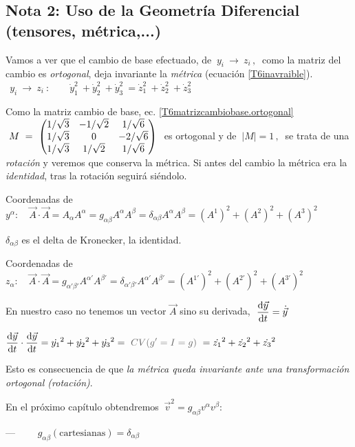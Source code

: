 \begin{ejemplo}
\subsection{Nota 2: Uso de la Geometría Diferencial (tensores, métrica,...)}
Vamos a ver que el cambio de base efectuado, de $\ y_i \ \to \ z_i\, ,\  $ como la matriz del cambio es \emph{ortogonal}, deja invariante la \emph{métrica} (ecuación \ref{T6inavraible}).
$\ \ y_i \ \to \ z_i \ : \qquad  \dot y_1^2 \ + \dot y_2^2 \ + \dot y_3^2 \ = \dot z_1^2 \ + \dot z_2^2 \ + \dot z_3^2 $

Como la matriz cambio de base, ec. \ref{T6matrizcambiobase.ortogonal}
$\ M\ = \ \mqty(1/\sqrt{3} & -1/\sqrt{2} & 1/\sqrt{6} \\ 1/\sqrt{3} & 0 & -2/\sqrt{6} \\ 1/\sqrt{3} & 1/\sqrt{2} & 1/\sqrt{6})\ $ es ortogonal y de $\ |M|=1\, , \ $ se trata de una \emph{rotación} y veremos que conserva la métrica. Si antes del cambio la métrica era la \emph{identidad}, tras la rotación seguirá siéndolo.

Coordenadas de $y^\alpha:\quad \overrightarrow A\cdot \overrightarrow A = A_\alpha A^\alpha =g_{\alpha \beta}A^\alpha A^\beta = 	\delta_{\alpha \beta} A^\alpha A^\beta =(A^1)^2+(A^2)^2+(A^3)^2$

\textcolor{gris}{$	\delta_{\alpha \beta}$ es el delta de Kronecker, la identidad.}

Coordenadas de $z_\alpha:\quad \overrightarrow A\cdot \overrightarrow A = g_{{\alpha'} {\beta'}} A^{\alpha'} A^{\beta'}=  \delta_{{\alpha'} {\beta'}} A^{\alpha'} A^{\beta'} =(A^{1'})^2+(A^{2'})^2+(A^{3'})^2$

En nuestro caso no tenemos un vector $\overrightarrow A$ sino su derivada, $\ \displaystyle \dv{\vec y}{t}=\dot{\vec y}$

$\displaystyle \displaystyle \dv{\vec y}{t} \cdot \displaystyle \dv{\vec y}{t} = \dot {y_1}^2+ \dot {y_2}^2+ \dot {y_3}^2=
\textcolor{gris}{\ CV(g'=I=g)\ }= \dot {z_1}^2+ \dot {z_2}^2+ \dot {z_3}^2$

Esto es consecuencia de que \emph{la métrica queda invariante ante una transformación ortogonal (rotación)}.

En el próximo capítulo obtendremos $\ {\vec v}^2=g_{\alpha \beta} v^\alpha v^\beta$:

\begin{adjustwidth}{20pt}{20pt}
--- $\qquad g_{\alpha \beta} (\text{cartesianas}) = \delta_{\alpha \beta}$


\end{adjustwidth}
\end{ejemplo}
